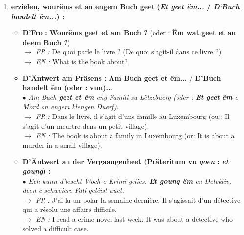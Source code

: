 \begin{enumerate}
    \item \textbf{ erzielen, wourëms et an engem Buch geet (\textit{Et geet ëm...} / \textit{D'Buch handelt ëm...}) :}
    \begin{itemize}
        \item \textbf{D'Fro :} \textbf{Wourëms geet et am Buch ?} (oder : \textbf{Ëm wat geet et an deem Buch ?}) \\
        $\rightarrow$ \textit{FR :} De quoi parle le livre ? (De quoi s'agit-il dans ce livre ?) \\
        $\rightarrow$ \textit{EN :} What is the book about?
        \item \textbf{D'Äntwert am Präsens :} \textbf{Am Buch geet et ëm...} / \textbf{D'Buch handelt ëm (oder : vun)...} \\
        $\bullet$ \textit{Am Buch \textbf{geet et ëm} eng Famill zu Lëtzebuerg (oder : \textbf{Et geet ëm} e Mord an engem klengen Duerf).} \\
        $\rightarrow$ \textit{FR :} Dans le livre, il s'agit d'une famille au Luxembourg (ou : Il s'agit d'un meurtre dans un petit village). \\
        $\rightarrow$ \textit{EN :} The book is about a family in Luxembourg (or: It is about a murder in a small village).
        \item \textbf{D'Äntwert an der Vergaangenheet (Präteritum vu \textit{goen} : \textit{et goung}) :} \\
        $\bullet$ \textit{Ech hunn d'lescht Woch e Krimi gelies. \textbf{Et goung ëm} en Detektiv, deen e schwéiere Fall geléist huet.} \\
        $\rightarrow$ \textit{FR :} J'ai lu un polar la semaine dernière. Il s'agissait d'un détective qui a résolu une affaire difficile. \\
        $\rightarrow$ \textit{EN :} I read a crime novel last week. It was about a detective who solved a difficult case.
    \end{itemize}

    \vspace{0.3em}


\end{enumerate}

